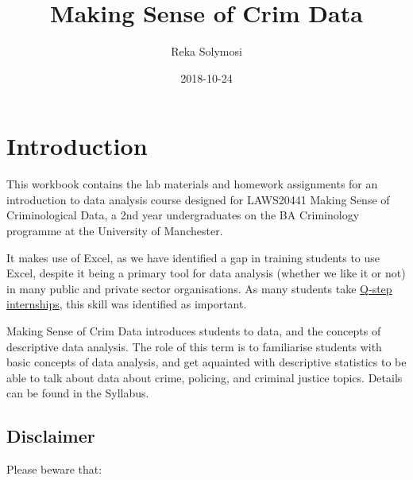 \documentclass[]{book}
\title{Making Sense of Crim Data}
\author{Reka Solymosi}
\date{2018-10-24}
\theoremstyle{definition}
\theoremstyle{definition}
\theoremstyle{definition}
\theoremstyle{remark}
\begin{document}
\maketitle

{
\setcounter{tocdepth}{1}
\tableofcontents
}
\hypertarget{introduction}{%
\chapter*{Introduction}\label{introduction}}

This workbook contains the lab materials and homework assignments for an
introduction to data analysis course designed for LAWS20441 Making Sense
of Criminological Data, a 2nd year undergraduates on the BA Criminology
programme at the University of Manchester.

It makes use of Excel, as we have identified a gap in training students
to use Excel, despite it being a primary tool for data analysis (whether
we like it or not) in many public and private sector organisations. As
many students take
\href{https://www.humanities.manchester.ac.uk/q-step/}{Q-step
internships}, this skill was identified as important.

Making Sense of Crim Data introduces students to data, and the concepts
of descriptive data analysis. The role of this term is to familiarise
students with basic concepts of data analysis, and get aquainted with
descriptive statistics to be able to talk about data about crime,
policing, and criminal justice topics. Details can be found in the
Syllabus.

\hypertarget{disclaimer}{%
\section{Disclaimer}\label{disclaimer}}

Please beware that:
\end{document}
